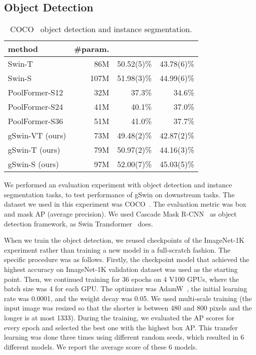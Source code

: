 \documentclass{article}
\begin{document}
\subsection{Object Detection}
\begin{table}[!t]
	\centering
	{
	\begin{tabular}{lrrr}
		\toprule
		method          & \#param. &  &  \\ \midrule
		Swin-T
		& 86M      & 50.52(5)\% & 43.78(6)\% \\
		Swin-S
		& 107M     & 51.98(3)\% & 44.99(6)\% \\ \midrule
		PoolFormer-S12
		& 32M & 37.3\% & 34.6\% \\
		PoolFormer-S24
		& 41M & 40.1\% & 37.0\% \\
		PoolFormer-S36
		& 51M & 41.0\% & 37.7\% \\ \midrule
		gSwin-VT (ours) & 73M      & 49.48(2)\% & 42.87(2)\%   \\
		gSwin-T (ours)  & 79M      & 50.97(2)\% & 44.16(3)\%   \\
		gSwin-S (ours)  & 97M      & 52.00(7)\% & 45.03(5)\%   \\
		\bottomrule
	\end{tabular}
	}
	\caption{
		COCO~\cite{lin2014microsoft} object detection and instance segmentation.
	}
	\label{label:016}
\end{table}
We performed an evaluation experiment with object detection and instance segmentation tasks, to test performance of gSwin on downstream tasks. The dataset we used in this experiment was COCO~\citep{lin2014microsoft}. The evaluation metric was box and mask AP (average precision).
We used Cascade Mask R-CNN~\citep{He2017MaskR, Cai2018CascadeRD} as object detection framework, as Swin Transformer~\citep{liu2021swin} does.

When we train the object detection, we reused checkpoints of the ImageNet-1K experiment rather than training a new model in a full-scratch fashion.
The specific procedure was as follows. Firstly, the checkpoint model that achieved the highest accuracy on ImageNet-1K validation dataset was used as the starting point. Then, we continued training for 36 epochs on 4 V100 GPUs, where the batch size was 4 for each GPU.
The optimizer was AdamW~\citep{kingma2014adam}, the initial learning rate was 0.0001, and the weight decay was 0.05.
We used multi-scale training (the input image was resized so that the shorter is between 480 and 800 pixels and the longer is at most 1333).
During the training, we evaluated the AP scores for every epoch and selected the best one with the highest box AP. This transfer learning was done three times using different random seeds, which resulted in 6 different models. We report the average score of these 6 models.
\end{document}
